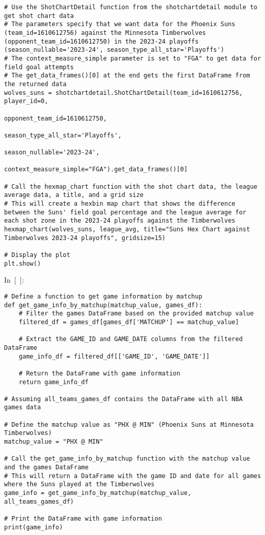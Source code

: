 \begin{verbatim}
# Use the ShotChartDetail function from the shotchartdetail module to get shot chart data
# The parameters specify that we want data for the Phoenix Suns (team_id=1610612756) against the Minnesota Timberwolves (opponent_team_id=1610612750) in the 2023-24 playoffs (season_nullable='2023-24', season_type_all_star='Playoffs')
# The context_measure_simple parameter is set to "FGA" to get data for field goal attempts
# The get_data_frames()[0] at the end gets the first DataFrame from the returned data
wolves_suns = shotchartdetail.ShotChartDetail(team_id=1610612756, player_id=0,
                                                         opponent_team_id=1610612750,
                                                         season_type_all_star='Playoffs',
                                                         season_nullable='2023-24',
                                                         context_measure_simple="FGA").get_data_frames()[0]

# Call the hexmap_chart function with the shot chart data, the league average data, a title, and a grid size
# This will create a hexbin map chart that shows the difference between the Suns' field goal percentage and the league average for each shot zone in the 2023-24 playoffs against the Timberwolves
hexmap_chart(wolves_suns, league_avg, title="Suns Hex Chart against Timberwolves 2023-24 playoffs", gridsize=15)

# Display the plot
plt.show()
\end{verbatim}

In~{[}~{]}:

\begin{verbatim}
# Define a function to get game information by matchup
def get_game_info_by_matchup(matchup_value, games_df):
    # Filter the games DataFrame based on the provided matchup value
    filtered_df = games_df[games_df['MATCHUP'] == matchup_value]

    # Extract the GAME_ID and GAME_DATE columns from the filtered DataFrame
    game_info_df = filtered_df[['GAME_ID', 'GAME_DATE']]

    # Return the DataFrame with game information
    return game_info_df

# Assuming all_teams_games_df contains the DataFrame with all NBA games data

# Define the matchup value as "PHX @ MIN" (Phoenix Suns at Minnesota Timberwolves)
matchup_value = "PHX @ MIN"

# Call the get_game_info_by_matchup function with the matchup value and the games DataFrame
# This will return a DataFrame with the game ID and date for all games where the Suns played at the Timberwolves
game_info = get_game_info_by_matchup(matchup_value, all_teams_games_df)

# Print the DataFrame with game information
print(game_info)
\end{verbatim}

